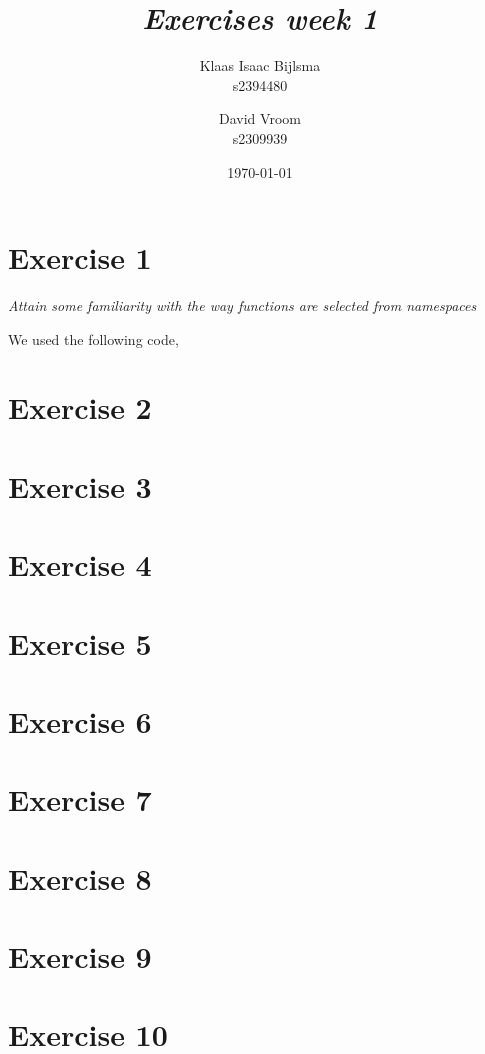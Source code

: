 \documentclass[12pt]{article}
\title{\itshape Exercises week 1}
\author{
	Klaas Isaac Bijlsma \\ s2394480
	\and
	David Vroom \\ s2309939
}
\date{\today}
\newcommand{\desc}[1]{\textit{#1} \vspace{1em}}
\begin{document}
\maketitle

\section*{Exercise 1}
\desc{Attain some familiarity with the way functions are selected from namespaces}

We used the following code,
%

\clearpage
\section*{Exercise 2}
\desc{}

\clearpage
\section*{Exercise 3}
\desc{}

\clearpage
\section*{Exercise 4}
\desc{}

\clearpage
\section*{Exercise 5}
\desc{}

\clearpage
\section*{Exercise 6}
\desc{}

\clearpage
\section*{Exercise 7}
\desc{}

\clearpage
\section*{Exercise 8}
\desc{}

\clearpage
\section*{Exercise 9}
\desc{}

\clearpage
\section*{Exercise 10}
\desc{}

\clearpage
\end{document}
